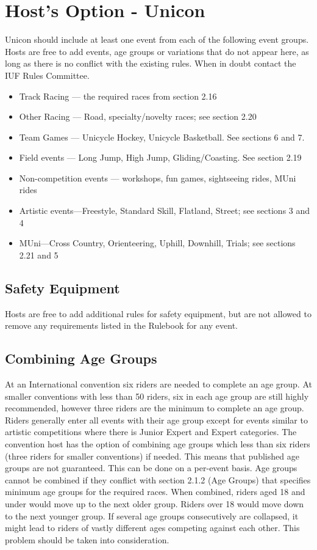 \section{Host's Option - Unicon}
Unicon should include at least one event from each of the following event groups. 
Hosts are free to add events, age groups or variations that do not appear here, as long as there is no conflict with the existing rules. 
When in doubt contact the IUF Rules Committee.
\begin{itemize}
  \item Track Racing — the required races from section 2.16
  \item Other Racing — Road, specialty/novelty races; see section 2.20
  \item Team Games — Unicycle Hockey, Unicycle Basketball. See sections 6 and 7.
  \item Field events — Long Jump, High Jump, Gliding/Coasting. See section 2.19
  \item Non-competition events — workshops, fun games, sightseeing rides, MUni rides
  \item Artistic events—Freestyle, Standard Skill, Flatland, Street; see sections 3 and 4
  \item MUni—Cross Country, Orienteering, Uphill, Downhill, Trials; see sections 2.21 and 5
\end{itemize}

\subsection{Safety Equipment}
Hosts are free to add additional rules for safety equipment, but are not allowed to remove any requirements listed in the Rulebook for any event.

\subsection{Combining Age Groups}
At an International convention six riders are needed to complete an age group. 
At smaller conventions with less than 50 riders, six in each age group are still highly recommended, however three riders are the minimum to complete an age group. 
Riders generally enter all events with their age group except for events similar to artistic competitions where there is Junior Expert and Expert categories. 
The convention host has the option of combining age groups which less than six riders (three riders for smaller conventions) if needed. 
This means that published age groups are not guaranteed. This can be done on a per-event basis. 
Age groups cannot be combined if they conflict with section 2.1.2 (Age Groups) that specifies minimum age groups for the required races. 
When combined, riders aged 18 and under would move up to the next older group. 
Riders over 18 would move down to the next younger group. If several age groups consecutively are collapsed, it might lead to riders of vastly different ages competing against each other. 
This problem should be taken into consideration.

